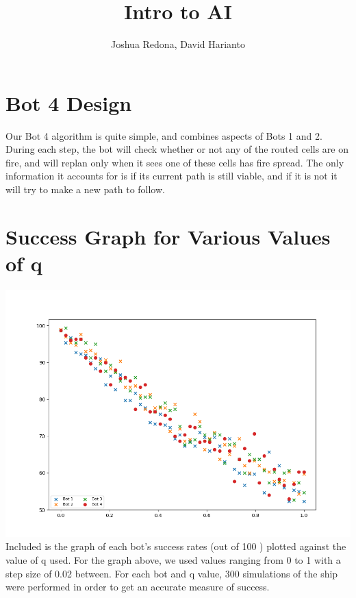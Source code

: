 \documentclass[12pt]{article}
\title{Intro to AI}
\author{Joshua Redona, David Harianto}
\begin{document}
\maketitle

\section*{Bot 4 Design}
Our Bot 4 algorithm is quite simple, and combines aspects of Bots 1 and 2. During each step, 
the bot will check whether or not any of the routed cells are on fire, and will replan 
only when it sees one of these cells has fire spread. The only information it accounts for 
is if its current path is still viable, and if it is not it will try to make a new path to follow.

\section*{Success Graph for Various Values of q}
\includegraphics[scale=0.61]{Figure_3}
\\
Included is the graph of each bot's success rates (out of 100 \text{\%}) plotted against 
the value of q used. For the graph above, we used values ranging from 0 to 1 with a step size of 
0.02 between. For each bot and q value, 300 simulations of the ship were performed in order to get an 
accurate measure of success.  
\end{document}

